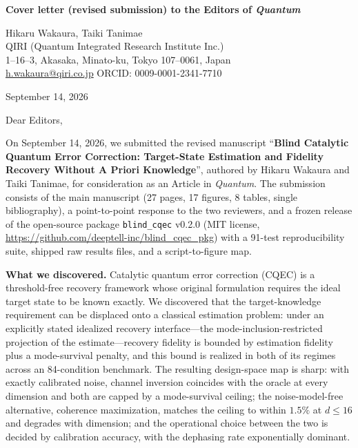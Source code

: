 \documentclass[11pt,a4paper]{article}
\begin{document}
\textbf{Cover letter (revised submission) to the Editors of \emph{Quantum}}

\vspace{0.4cm}

Hikaru Wakaura, Taiki Tanimae \\
QIRI (Quantum Integrated Research Institute Inc.)\\
1--16--3, Akasaka, Minato-ku, Tokyo 107--0061, Japan\\
\href{mailto:h.wakaura@qiri.co.jp}{h.wakaura@qiri.co.jp} \quad ORCID: 0009-0001-2341-7710

\vspace{0.3cm}
September 14, 2026

\vspace{0.4cm}

Dear Editors,

\medskip

On September 14, 2026, we submitted the revised manuscript ``\textbf{Blind Catalytic Quantum Error Correction: Target-State Estimation and Fidelity Recovery Without A Priori Knowledge}'', authored by Hikaru Wakaura and Taiki Tanimae, for consideration as an Article in \emph{Quantum}.
The submission consists of the main manuscript (27 pages, 17 figures, 8 tables, single bibliography), a point-to-point response to the two reviewers, and a frozen release of the open-source package \texttt{blind\_cqec} v0.2.0 (MIT license, \url{https://github.com/deeptell-inc/blind_cqec_pkg}) with a 91-test reproducibility suite, shipped raw results files, and a script-to-figure map.

\medskip

\textbf{What we discovered.}
Catalytic quantum error correction (CQEC) is a threshold-free recovery framework whose original formulation requires the ideal target state to be known exactly.
We discovered that the target-knowledge requirement can be displaced onto a classical estimation problem: under an explicitly stated idealized recovery interface---the mode-inclusion-restricted projection of the estimate---recovery fidelity is bounded by estimation fidelity plus a mode-survival penalty, and this bound is realized in both of its regimes across an 84-condition benchmark.
The resulting design-space map is sharp: with exactly calibrated noise, channel inversion coincides with the oracle at every dimension and both are capped by a mode-survival ceiling; the noise-model-free alternative, coherence maximization, matches the ceiling to within $1.5\%$ at $d \leq 16$ and degrades with dimension; and the operational choice between the two is decided by calibration accuracy, with the dephasing rate exponentially dominant.
\end{document}
